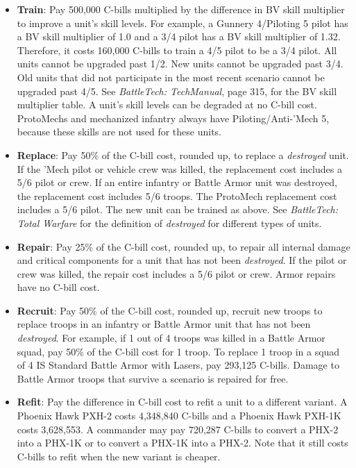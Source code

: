 \documentclass{article}
\begin{document}
\begin{itemize}

\item {\bfseries Train}: Pay 500,000 C-bills multiplied by the difference in BV skill multiplier to improve a unit's skill levels.
For example, a Gunnery 4/Piloting 5 pilot has a BV skill multiplier of 1.0 and a 3/4 pilot has a BV skill multiplier of 1.32.
Therefore, it costs 160,000 C-bills to train a 4/5 pilot to be a 3/4 pilot.
All units cannot be upgraded past 1/2.
New units cannot be upgraded past 3/4.
Old units that did not participate in the most recent scenario cannot be upgraded past 4/5.
See \emph{BattleTech: TechManual}, page 315, for the BV skill multiplier table.
A unit's skill levels can be degraded at no C-bill cost.
ProtoMechs and mechanized infantry always have Piloting/Anti-'Mech 5, because these skills are not used for these units.

\item {\bfseries Replace}: Pay 50\% of the C-bill cost, rounded up, to replace a \emph{destroyed} unit.
If the 'Mech pilot or vehicle crew was killed, the replacement cost includes a 5/6 pilot or crew.
If an entire infantry or Battle Armor unit was destroyed, the replacement cost includes 5/6 troops.
The ProtoMech replacement cost includes a 5/6 pilot.
The new unit can be trained as above.
See \emph{BattleTech: Total Warfare} for the definition of \emph{destroyed} for different types of units.

\item {\bfseries Repair}: Pay 25\% of the C-bill cost, rounded up, to repair all internal damage and critical components for a unit that has not been \emph{destroyed}.
If the pilot or crew was killed, the repair cost includes a 5/6 pilot or crew.
Armor repairs have no C-bill cost.

\item {\bfseries Recruit}: Pay 50\% of the C-bill cost, rounded up, recruit new troops to replace troops in an infantry or Battle Armor unit that has not been \emph{destroyed}.
For example, if 1 out of 4 troops was killed in a Battle Armor squad, pay 50\% of the C-bill cost for 1 troop.
To replace 1 troop in a squad of 4 IS Standard Battle Armor with Lasers, pay 293,125 C-bills.
Damage to Battle Armor troops that survive a scenario is repaired for free.

\item {\bfseries Refit}: Pay the difference in C-bill cost to refit a unit to a different variant.
A Phoenix Hawk PXH-2 costs 4,348,840 C-bills and a Phoenix Hawk PXH-1K costs 3,628,553.
A commander may pay 720,287 C-bills to convert a PHX-2 into a PHX-1K or to convert a PHX-1K into a PHX-2.
Note that it still costs C-bills to refit when the new variant is cheaper.


\end{itemize}
\end{document}
